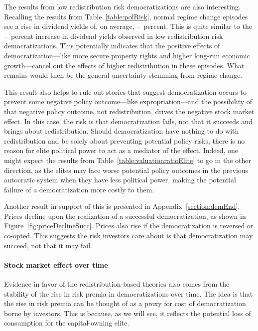 \documentclass[12pt]{article}
\numberwithin{equation}{section}
\begin{document}
The results from low redistribution risk democratizations are also interesting. Recalling the results from Table~\ref{table:polRisk}, normal regime change episodes see a rise in dividend yields of, on average, \tabThreeRegChLow\---\tabThreeRegChHigh\ percent. This is quite similar to the \tabTenLowRiskLow\---\tabTenLowRiskHigh\ percent increase in dividend yields observed in low redistribution risk democratizations. This potentially indicates that the positive effects of democratization---like more secure property rights and higher long-run economic growth---cancel out the effects of higher redistribution in these episodes. What remains would then be the general uncertainty stemming from regime change.

\label{par:rule_out_expro_beg}
This result also helps to rule out stories that suggest democratization occurs to prevent some negative policy outcome---like expropriation---and the possibility of that negative policy outcome, not redistribution, drives the negative stock market effect. In this case, the risk is that democratization fails, not that it succeeds and brings about redistribution. Should democratization have nothing to do with redistribution and be solely about preventing potential policy risks, there is no reason for elite political power to act as a mediator of the effect. Indeed, one might expect the results from Table~\ref{table:valuationratioElite} to go in the other direction, as the elites may face worse potential policy outcomes in the previous autocratic system when they have less political power, making the potential failure of a democratization more costly to them.

Another result in support of this is presented in Appendix~\ref{section:demEnd}. Prices decline upon the realization of a successful democratization, as shown in Figure~\ref{fig:priceDeclineSucc}. Prices also rise if the democratization is reversed or co-opted. This suggests the risk investors care about is that democratization may succeed, not that it may fail.
\label{par:rule_out_expro_end}

\paragraph{Stock market effect over time}

Evidence in favor of the redistribution-based theories also comes from the stability of the rise in risk premia in democratizations over time. The idea is that the rise in risk premia can be thought of as a proxy for cost of democratization borne by investors. This is because, as we will see, it reflects the potential loss of consumption for the capital-owning elite. 
\end{document}
